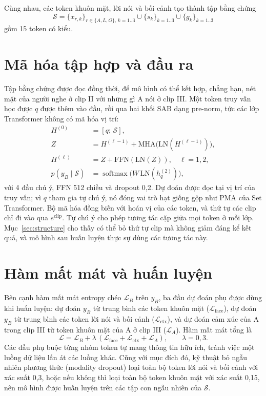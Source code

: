 Cùng nhau, các token khuôn mặt, lời nói và bối cảnh tạo thành tập bằng chứng
\begin{equation}
\mathcal{S} = \{x_{r,k}\}_{r \in \{A,L,O\},\,k=1..3} \cup \{s_k\}_{k=1..3} \cup \{g_k\}_{k=1..3}
\end{equation}
gồm 15 token có kiểu.

\section{Mã hóa tập hợp và đầu ra}
\label{sec:encoder}

Tập bằng chứng được đọc đồng thời, để mô hình có thể kết hợp, chẳng hạn, nét mặt của người nghe ở clip II với những gì A nói ở clip III. Một token truy vấn học được $q$ được thêm vào đầu, rồi qua hai khối SAB dạng pre-norm, tức các lớp Transformer không có mã hóa vị trí:
\begin{align}
H^{(0)} &= [q;\,\mathcal{S}], \nonumber\\
Z &= H^{(\ell-1)} + \mathrm{MHA}\big(\mathrm{LN}(H^{(\ell-1)})\big), \nonumber\\
H^{(\ell)} &= Z + \mathrm{FFN}(\mathrm{LN}(Z)),\quad \ell = 1, 2, \\
p(y_B \mid \mathcal{S}) &= \operatorname{softmax}\big(W\,\mathrm{LN}(h^{(2)}_q)\big),
\end{align}
với 4 đầu chú ý, FFN 512 chiều và dropout 0,2. Dự đoán được đọc tại vị trí của truy vấn; vì $q$ tham gia tự chú ý, nó đóng vai trò hạt giống gộp như PMA của Set Transformer. Bộ mã hóa đồng biến với hoán vị của các token, và thứ tự các clip chỉ đi vào qua $e^{\text{clip}}$. Tự chú ý cho phép tương tác cặp giữa mọi token ở mỗi lớp. Mục~\ref{sec:structure} cho thấy có thể bỏ thứ tự clip mà không giảm đáng kể kết quả, và mô hình sau huấn luyện thực sự dùng các tương tác này.

\section{Hàm mất mát và huấn luyện}

Bên cạnh hàm mất mát entropy chéo $\mathcal{L}_B$ trên $y_B$, ba đầu dự đoán phụ được dùng khi huấn luyện: dự đoán $y_B$ từ trung bình các token khuôn mặt ($\mathcal{L}_{\text{face}}$), dự đoán $y_B$ từ trung bình các token lời nói và bối cảnh ($\mathcal{L}_{\text{ctx}}$), và dự đoán cảm xúc của A trong clip III từ token khuôn mặt của A ở clip III ($\mathcal{L}_{A}$). Hàm mất mát tổng là
\begin{equation}
\mathcal{L} = \mathcal{L}_B + \lambda\,(\mathcal{L}_{\text{face}} + \mathcal{L}_{\text{ctx}} + \mathcal{L}_{A}), \qquad \lambda = 0{,}3 .
\end{equation}
Các đầu phụ buộc từng nhóm token tự mang thông tin hữu ích, tránh việc một luồng dữ liệu lấn át các luồng khác. Cũng với mục đích đó, kỹ thuật bỏ ngẫu nhiên phương thức (modality dropout) \cite{neverova2016moddrop} loại toàn bộ token lời nói và bối cảnh với xác suất 0,3, hoặc nếu không thì loại toàn bộ token khuôn mặt với xác suất 0,15, nên mô hình được huấn luyện trên các tập con ngẫu nhiên của $\mathcal{S}$.

